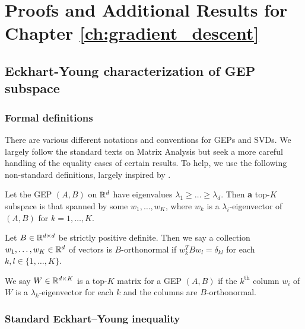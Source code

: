 \graphicspath{{chapters/gradient_descent/}}
\chapter{Proofs and Additional Results for Chapter \ref{ch:gradient_descent}}\label{app:gradient_descent}
\section{Eckhart-Young characterization of GEP subspace}\label{supp:proofs}
\subsection{Formal definitions}
There are various different notations and conventions for GEPs and SVDs.
We largely follow the standard texts on Matrix Analysis \citep{stewart_matrix_1990,bhatiamatrix1997} but seek a more careful handling of the equality cases of certain results.
To help, we use the following non-standard definitions, largely inspired by \citet{carlssonvon2021}.

\begin{definition}
    Let the GEP $(A,B)$ on $\mathbb{R}^d$ have eigenvalues $\lambda_1 \geq \dots \geq \lambda_d$. Then \textbf{a} top-$K$ subspace is that spanned by some $w_1,\dots,w_K$, where $w_k$ is a $\lambda_i$-eigenvector of $(A,B)$ for $k=1,\dots,K$.
\end{definition}

\begin{definition}[$B$-orthonormality]
    Let $B \in \mathbb{R}^{d \times d}$ be strictly positive definite. Then we say a collection $w_1,\dots,w_K \in \mathbb{R}^{d}$ of vectors is $B$-orthonormal if $w_k^T B w_l = \delta_{kl}$ for each $k,l \in \{1,\dots,K\}$.
\end{definition}

\begin{definition}
    We say $W \in \mathbb{R}^{d \times K}$ is a top-$K$ matrix for a GEP $(A,B)$ if the $k^{\text{th}}$ column $w_i$ of $W$ is a $\lambda_k$-eigenvector for each $k$ and the columns are $B$-orthonormal.
\end{definition}


\subsection{Standard Eckhart--Young inequality}

